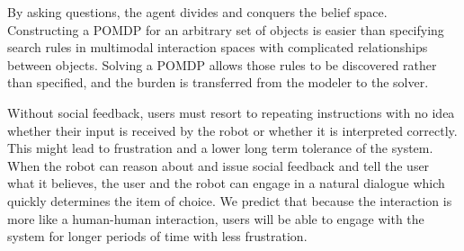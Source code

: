 \documentclass[letterpaper]{article}
\begin{document}
By asking questions, the agent divides and conquers the belief space. Constructing
a POMDP for an arbitrary set of objects is easier than specifying search rules
in multimodal interaction spaces with complicated relationships between objects.
Solving a POMDP allows those rules to be discovered rather than specified, and the
burden is transferred from the modeler to the solver.




\begin{table}
\begin{center}
\caption{\label{table:expDialogue} Example dialogue from interactions with our system. The robot chooses to ask more informative questions because the search depth of the planner is three rather than two.}
\end{center}
\end{table}

Without social feedback,
users must resort to repeating instructions with no idea whether their input is
received by the robot or whether it is interpreted correctly. This might lead
to frustration and a lower long term tolerance of the system.  When the robot
can reason about and issue social feedback and tell the user what it believes,
the user and the robot can engage in a natural dialogue which quickly
determines the item of choice. We predict that because the interaction is more
like a human-human interaction, users will be able to engage with the system for longer periods
of time with less frustration.
 
\end{document}
